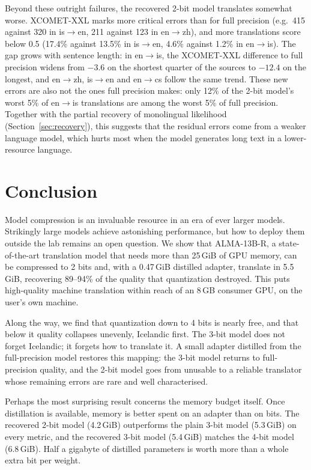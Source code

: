 \documentclass[10pt]{article}
\begin{document}
Beyond these outright failures, the recovered 2-bit model translates somewhat
worse. XCOMET-XXL marks more critical errors than for full precision (e.g.\ 415
against 320 in is$\rightarrow$en, 211 against 123 in en$\rightarrow$zh), and more
translations score below 0.5 (17.4\% against 13.5\% in is$\rightarrow$en, 4.6\%
against 1.2\% in en$\rightarrow$is). The gap grows with sentence length: in
en$\rightarrow$is, the XCOMET-XXL difference to full precision widens from
$-3.6$ on the shortest quarter of the sources to $-12.4$ on the longest, and
en$\rightarrow$zh, is$\rightarrow$en and en$\rightarrow$cs follow the same trend.
These new errors are also not the ones full precision makes: only 12\% of the
2-bit model's worst 5\% of en$\rightarrow$is translations are among the worst 5\%
of full precision. Together with the partial recovery of monolingual likelihood
(Section~\ref{sec:recovery}), this suggests that the residual errors come from a
weaker language model, which hurts most when the model generates long text in a
lower-resource language.

\section{Conclusion}

Model compression is an invaluable resource in an era of ever larger models.
Strikingly large models achieve astonishing performance, but how to deploy them
outside the lab remains an open question. We show that ALMA-13B-R, a
state-of-the-art translation model that needs more than 25\,GiB of GPU memory,
can be compressed to 2 bits and, with a 0.47\,GiB distilled adapter, translate
in 5.5\,GiB, recovering 89--94\% of the quality that quantization destroyed. This puts high-quality machine
translation within reach of an 8\,GB consumer GPU, on the user's own machine.

Along the way, we find that quantization down to 4 bits is nearly free, and
that below it quality collapses unevenly, Icelandic first. The 3-bit model does
not forget Icelandic; it forgets how to translate it. A small adapter distilled
from the full-precision model restores this mapping: the 3-bit model returns to
full-precision quality, and the 2-bit model goes from unusable to a reliable
translator whose remaining errors are rare and well characterised.

Perhaps the most surprising result concerns the memory budget itself. Once
distillation is available, memory is better spent on an adapter than on bits.
The recovered 2-bit model (4.2\,GiB) outperforms the plain 3-bit model
(5.3\,GiB) on every metric, and the recovered 3-bit model (5.4\,GiB) matches
the 4-bit model (6.8\,GiB). Half a gigabyte of distilled parameters is worth
more than a whole extra bit per weight.
\end{document}

